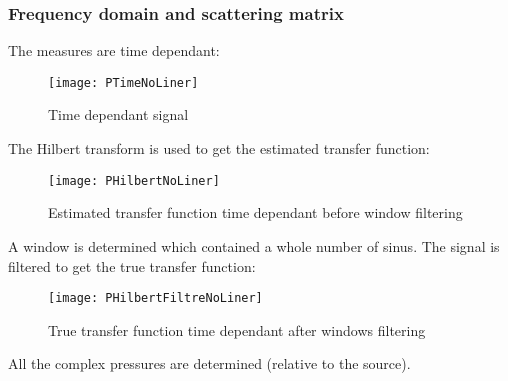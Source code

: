 \subsubsection{Frequency domain and scattering matrix}
The measures are time dependant: 
\begin{figure}[H] \centering
    \texttt{[image: PTimeNoLiner]}
    \caption{Time dependant signal}
\end{figure}
The Hilbert transform is used to get the estimated transfer function:
\begin{figure}[H] \centering
    \texttt{[image: PHilbertNoLiner]}
    \caption{Estimated transfer function time dependant before window filtering}
\end{figure}
A window is determined which contained a whole number of sinus. The signal is filtered to get the true transfer function:
\begin{figure}[H] \centering
    \texttt{[image: PHilbertFiltreNoLiner]}
    \caption{True transfer function time dependant after windows filtering}
\end{figure}
All the complex pressures are determined (relative to the source).
